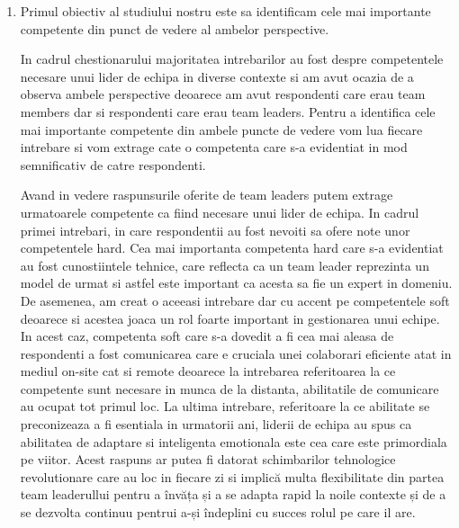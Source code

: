 \documentclass[a4paper, 12pt]{article}
\begin{document}
	\begin{enumerate}[(1)]

	\item Primul obiectiv al studiului nostru este sa identificam cele mai importante competente din punct de vedere al ambelor perspective.

	\quad In cadrul chestionarului majoritatea intrebarilor au fost despre competentele necesare unui lider de echipa in diverse contexte si am avut ocazia de a observa ambele perspective deoarece am avut respondenti care erau team members dar si respondenti care erau team leaders. Pentru a identifica cele mai importante competente din ambele puncte de vedere vom lua fiecare intrebare si vom extrage cate o competenta care s-a evidentiat in mod semnificativ de catre respondenti. 

	\quad Avand in vedere raspunsurile oferite de team leaders putem extrage urmatoarele competente ca fiind necesare unui lider de echipa. In cadrul primei intrebari, in care respondentii au fost nevoiti sa ofere note unor competentele hard. Cea mai importanta competenta hard care s-a evidentiat au fost cunostiintele tehnice, care reflecta ca un team leader reprezinta un model de urmat si astfel este important ca acesta sa fie un expert in domeniu. De asemenea, am creat o aceeasi intrebare dar cu accent pe  competentele soft deoarece si acestea joaca un rol foarte important in gestionarea unui echipe. In acest caz, competenta soft care s-a dovedit a fi cea mai aleasa de respondenti a fost comunicarea care e cruciala  unei colaborari eficiente atat in mediul on-site cat si remote deoarece la intrebarea referitoarea la ce competente sunt necesare in munca de la distanta, abilitatile de comunicare au ocupat tot  primul loc. La ultima intrebare, referitoare la ce abilitate se preconizeaza a fi esentiala in urmatorii ani, liderii de echipa au spus ca abilitatea de adaptare si inteligenta emotionala este cea care este primordiala pe viitor. Acest raspuns ar putea fi datorat schimbarilor tehnologice revolutionare care au loc in fiecare zi si  implică multa flexibilitate din partea team leaderullui pentru a  învăța și a se adapta rapid la noile contexte  și de a se dezvolta continuu pentrui a-și îndeplini cu succes rolul pe care il are.


\end{enumerate}
\end{document}
